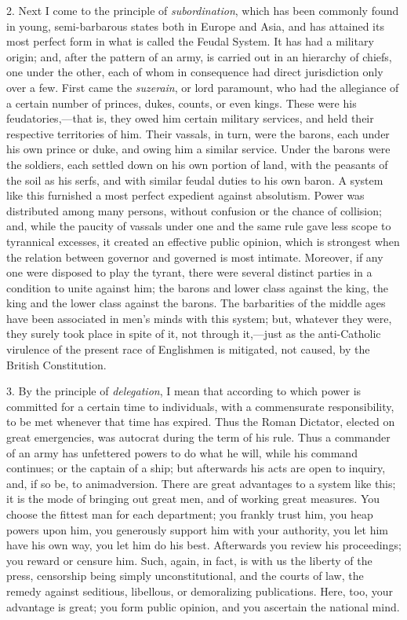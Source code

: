 2. Next I come to the principle of \emph{subordination},
which has been commonly found in young, semi-barbarous states both in
Europe and Asia, and has attained its most perfect form in what is
called the Feudal System. It has had a military origin; and, after the
pattern of an army, is carried out in an hierarchy of chiefs, one
under the other, each of whom in consequence had direct jurisdiction
only over a few. First came the \emph{suzerain}, or lord paramount,
who had the allegiance of a certain number of princes, dukes, counts,
or even kings. These were his feudatories,—that is, they owed
him certain military services, and held their respective territories
of him. Their vassals, in turn, were the barons, each under his own
prince or duke, and owing him a similar service. Under the barons were
the soldiers, each settled down on his own portion of land, with the
peasants of the soil as his serfs, and with similar feudal duties to
his own baron. A system like this furnished a most perfect expedient
against absolutism. Power was distributed among many persons, without
confusion or the chance of collision; and, while the paucity of
vassals under one and the same rule gave less scope to tyrannical
excesses, it created an effective public opinion, which is strongest
when the relation between governor and governed is most intimate.
Moreover, if any one were disposed to play the tyrant, there were
several distinct parties in a condition to unite against him; the
barons and lower class against the king, the king and the lower class
against the barons. The barbarities of the middle ages have been
associated in men's minds with this system; but, whatever they were,
they surely took place in spite of it, not through it,—just as the
anti-Catholic virulence of the present race of Englishmen is
mitigated, not caused, by the British Constitution.

3. By the principle of \emph{delegation}, I mean
that according to which power is committed for a certain time to
individuals, with a commensurate responsibility, to be met whenever
that time has expired. Thus the Roman Dictator, elected on great
emergencies, was autocrat during the term of his rule. Thus a
commander of an army has unfettered powers to do what he will, while
his command continues; or the captain of a ship; but afterwards his
acts are open to inquiry, and, if so be, to animadversion. There are
great advantages to a system like this; it is the mode of
bringing out great men, and of working great measures. You choose the
fittest man for each department; you frankly trust him, you heap
powers upon him, you generously support him with your authority, you
let him have his own way, you let him do his best. Afterwards you
review his proceedings; you reward or censure him. Such, again, in
fact, is with us the liberty of the press, censorship being simply
unconstitutional, and the courts of law, the remedy against seditious,
libellous, or demoralizing publications. Here, too, your advantage is
great; you form public opinion, and you ascertain the national mind.

